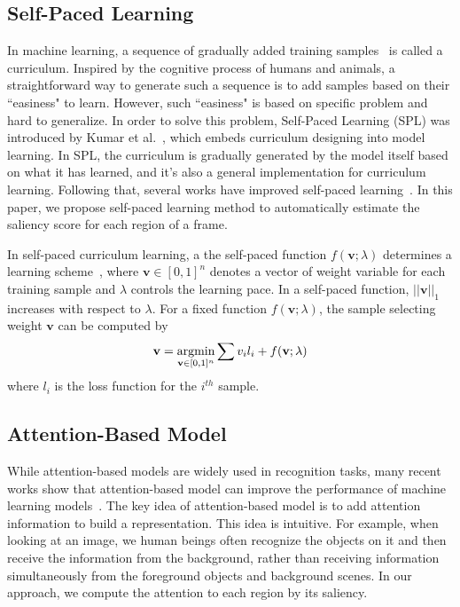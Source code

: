 \subsection{Self-Paced Learning}
\par
In machine learning, a sequence of gradually  added training samples~\cite{bengio2009curriculum} is called a curriculum. Inspired by the cognitive process of humans and animals, a straightforward way to generate such a sequence is to add samples based on their ``easiness" to learn. However, such ``easiness" is based on specific problem and hard to generalize. In order to solve this problem, Self-Paced Learning (SPL) was introduced by Kumar et al.~\cite{kumar2010self}, which embeds curriculum designing into model learning. In SPL, the curriculum is gradually generated by the model itself based on what it has learned, and it's also a general implementation for curriculum learning. Following that, several works have improved self-paced learning~\cite{jiang2014easy, tang2012shifting, jiang2014self, jiang2015self}. In this paper, we propose self-paced learning method to automatically estimate the saliency score for each region of a frame.
\par
In self-paced curriculum learning, a the self-paced function $f(\mathbf{v};\lambda)$ determines a learning scheme~\cite{jiang2015self}, where $\mathbf{v}\in [0,1]^n$ denotes a vector of weight variable for each training sample and $\lambda$ controls the learning pace. In a self-paced function, $||\mathbf{v}||_1$ increases with respect to $\lambda$. For a fixed function $f(\mathbf{v};\lambda)$, the sample selecting weight $\mathbf{v}$ can be computed by 
\begin{equation}
\mathbf{v} = \operatorname*{argmin}_{\mathbf{v}\in [0,1]^n}\sum v_il_i + f(\mathbf{v};\lambda)
\label{samplesel}
\end{equation} 
where $l_i$ is the loss function for the $i^{th}$ sample.

\subsection{Attention-Based Model}
While attention-based models are widely used in recognition tasks, many recent works show that attention-based model can improve the performance of machine learning models~\cite{mnih2014recurrent, zheng2015neural}. The key idea of attention-based model is to add attention information to build a representation. This idea is intuitive. For example, when looking at an image, we human beings often recognize the objects on it and then receive the information from the background, rather than receiving information simultaneously from the foreground objects and background scenes. In our approach, we compute the attention to each region by its saliency. 



